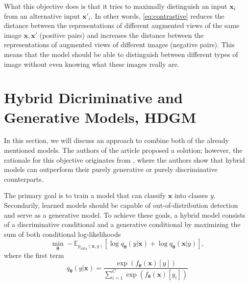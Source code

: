 What this objective does is that it tries to maximally distinguish an input $\boldsymbol{x}_i$ from an alternative input $\boldsymbol{x}'_i$. In other words, \eqref{eq:contrastive} reduces the distance between the representations of different augmented views of the same image $\boldsymbol{x}, \boldsymbol{x}'$ (positive pairs) and increases the distance between the representations of augmented views of different images (negative pairs). This means that the model should be able to distinguish between different types of image without even knowing what these images really are. 



\section{Hybrid Dicriminative and Generative Models, HDGM}
In this section, we will discuss an approach to combine both of the already mentioned models.
The authors of the article \cite{HDGEmain} proposed a solution; however, the rationale for this objective originates from \cite{generativevsdisriminative}, where the authors show that hybrid models can outperform their purely generative or purely discriminative counterparts.

The primary goal is to train a model that can classify $\boldsymbol{x}$ into classes $y$. Secondarily, learned models should be capable of out-of-distribution detection and serve as a generative model. To achieve these goals, a hybrid model consists of a discriminative conditional and a generative conditional by maximizing the sum of both conditional log-likelihoods
\begin{equation}\label{q1q2}
	\min_{\boldsymbol{\theta}}- \mathbb{E}_{p_{\mathrm{data}}(\boldsymbol{x},y)}\left[\log q_{\boldsymbol{\theta}}\left(y|\boldsymbol{x}\right)+ \log q_{\boldsymbol{\theta}}\left(\boldsymbol{x}|y\right) \right],
\end{equation}
where the first term 
\begin{equation}
q_{\boldsymbol{\theta}}\left(y|\boldsymbol{x}\right) = \frac{\exp\left({f_{\boldsymbol{\theta}}\left(\boldsymbol{x}\right)[y]}\right)}{\sum_{i=1}^C\exp\left({f_{\boldsymbol{\theta}}\left(\boldsymbol{x}\right)[y_i]}\right)}
\end{equation}

